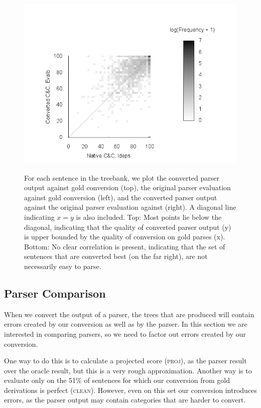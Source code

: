 \begin{figure}
{    \hfill
    \includegraphics[trim={15mm 0 65mm 40mm},clip]{figures/heat-both}
  }
	\caption{
		\label{fig:scatter_plots}
		For each sentence in the treebank, we plot the converted parser output against gold conversion (top), the original parser evaluation against gold conversion (left), and the converted parser output against the original parser evaluation against (right).
		A diagonal line indicating $x=y$ is also included.
		Top: Most points lie below the diagonal, indicating that the quality of converted parser output (y) is upper bounded by the quality of conversion on gold parses (x).
		Bottom: No clear correlation is present, indicating that the set of sentences that are converted best (on the far right), are not necessarily easy to parse.
	}
\end{figure}

\subsection{Parser Comparison}

When we convert the output of a \ccg parser, the \ptb trees that are produced
will contain errors created by our conversion as well as by the parser. In this
section we are interested in comparing parsers, so we need to factor out errors
created by our conversion.

One way to do this is to calculate a projected score (\textsc{proj}), as the
parser result over the oracle result, but this is a very rough approximation.
Another way is to evaluate only on the 51\% of sentences for which our
conversion from gold \ccg derivations is perfect (\textsc{clean}).  However,
even on this set our conversion introduces errors, as the parser output may
contain categories that are harder to convert.

